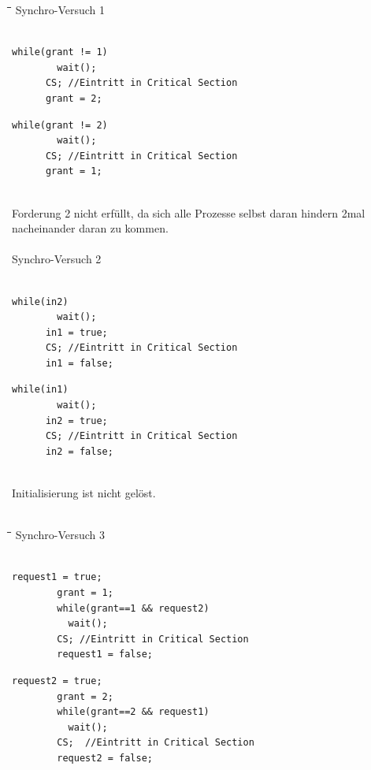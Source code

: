 \begin{tabbing}
  \hspace*{1cm}\=\hspace*{4.2cm}\=\hspace*{3cm}\=\hspace*{2.7cm}\= \kill
  Synchro-Versuch 1\\
   \> \> \\
  \>\begin{lstlisting}[style=C]
      while(grant != 1)
        wait(); 
      CS; //Eintritt in Critical Section 
      grant = 2; 
    \end{lstlisting} \> \> \>
    \begin{lstlisting}[style=C]
      while(grant != 2)
        wait(); 
      CS; //Eintritt in Critical Section  
      grant = 1; 
    \end{lstlisting} \\
    Forderung 2 nicht erfüllt, da sich alle Prozesse selbst daran hindern 2mal nacheinander daran zu kommen.\\\\
    
  Synchro-Versuch 2\\
    \> \> \\
   \>\begin{lstlisting}[style=C]
      while(in2)
        wait(); 
      in1 = true; 
      CS; //Eintritt in Critical Section 
      in1 = false; 
    \end{lstlisting} \> \> \>
    \begin{lstlisting}[style=C]
      while(in1)
        wait(); 
      in2 = true; 
      CS; //Eintritt in Critical Section 
      in2 = false; 
    \end{lstlisting} \\
    Initialisierung ist nicht gelöst.\\\\
\end{tabbing}
\newpage
\begin{tabbing}
  \hspace*{1cm}\=\hspace*{4.2cm}\=\hspace*{3cm}\=\hspace*{2.7cm}\= \kill
  Synchro-Versuch 3\\
    \> \> \\
   \>\begin{lstlisting}[style=C]
        request1 = true; 
        grant = 1; 
        while(grant==1 && request2)
          wait(); 
        CS; //Eintritt in Critical Section  
        request1 = false; 
    \end{lstlisting} \> \> \>
    \begin{lstlisting}[style=C]
        request2 = true; 
        grant = 2; 
        while(grant==2 && request1)
          wait(); 
        CS;  //Eintritt in Critical Section 
        request2 = false;  
    \end{lstlisting} \\ 
\end{tabbing}

